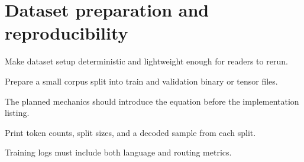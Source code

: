 \section{Dataset preparation and reproducibility}
\label{sec:ch11-dataset-preparation-and-reproducibility}

Make dataset setup deterministic and lightweight enough for readers to rerun.



Prepare a small corpus split into train and validation binary or tensor files.



The planned mechanics should introduce the equation before the implementation listing.





\begin{checkpointbox}
Print token counts, split sizes, and a decoded sample from each split.
\end{checkpointbox}

Training logs must include both language and routing metrics.
